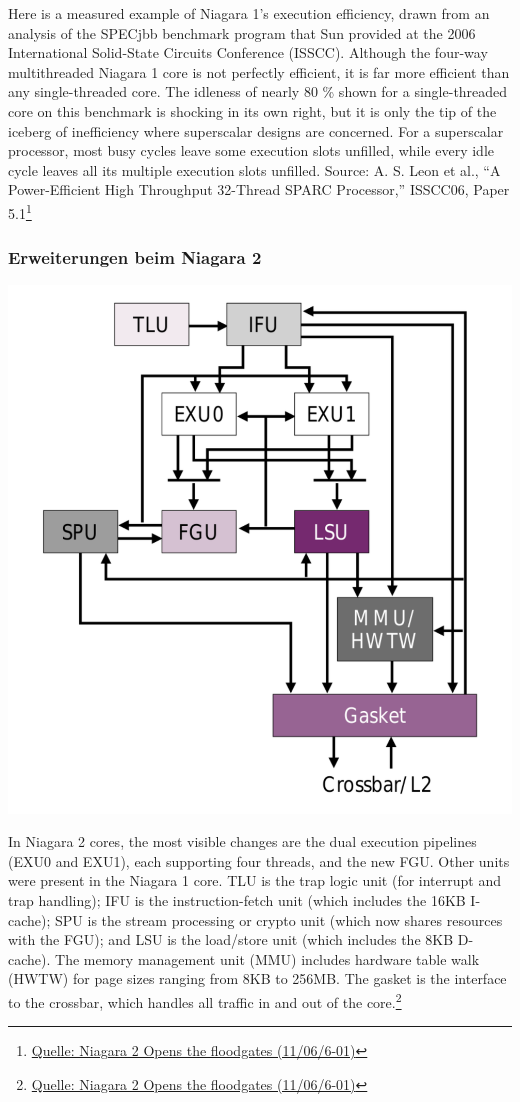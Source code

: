 Here is a measured example of Niagara 1’s execution efficiency, drawn from an analysis of the SPECjbb benchmark program that Sun provided at the 2006 International Solid-State Circuits Conference (ISSCC). Although the four-way multithreaded Niagara 1 core is not perfectly efficient, it is far more efficient than any single-threaded core. The idleness of nearly 80 \% shown for a single-threaded core on this benchmark is shocking in its own right, but it is only the tip of the iceberg of inefficiency where superscalar designs are concerned. For a superscalar processor, most busy cycles leave some execution slots unfilled, while every idle cycle leaves all its multiple execution slots unfilled. Source: A. S. Leon et al., "`A Power-Efficient High Throughput 32-Thread SPARC Processor,"' ISSCC06, Paper 5.1\footnote{\url{Quelle: Niagara 2 Opens the floodgates (11/06/6-01)}}

\subsubsection{Erweiterungen beim Niagara 2}
\includegraphics[scale=0.35]{mikroprozessoren2/Niagara2_Erweiterungen.pdf}

In Niagara 2 cores, the most visible changes are the dual execution pipelines (EXU0 and EXU1), each supporting four threads, and the new FGU. Other units were present in the Niagara 1 core. TLU is the trap logic unit (for interrupt and trap handling); IFU is the instruction-fetch unit (which includes the 16KB I-cache); SPU is the stream processing or crypto unit (which now shares resources with the FGU); and LSU is the load/store unit (which includes the 8KB D-cache). The memory management unit (MMU) includes hardware table walk (HWTW) for page sizes ranging from 8KB to 256MB. The gasket is the interface to the crossbar, which handles all traffic in and out of the core.\footnote{\url{Quelle: Niagara 2 Opens the floodgates (11/06/6-01)}}



